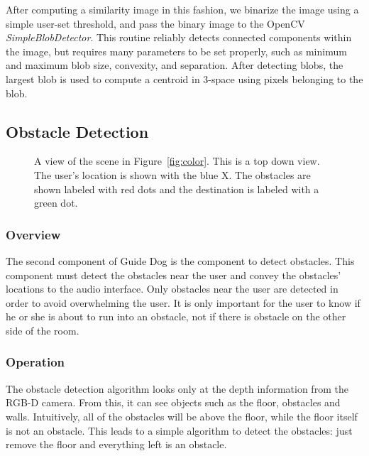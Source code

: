 After computing a similarity image in this fashion, we binarize the image
using a simple user-set threshold, and pass the binary image to the OpenCV~\cite{opencv-website}
\emph{SimpleBlobDetector}. This routine reliably detects connected components
within the image, but requires many parameters to be set properly, such as
minimum and maximum  blob size, convexity, and separation. After detecting blobs, the 
largest blob is used to compute a centroid in 3-space using pixels belonging 
to the blob.

\subsection{Obstacle Detection}
\label{sec:technical-obs}

\begin{figure}
\caption{A view of the scene in Figure~\ref{fig:color}. This is a top down view.
  The user's location is shown with the blue X. The obstacles are shown labeled
  with red dots and the destination is labeled with a green dot.}
\label{fig:obstacle}
\end{figure}

\subsubsection{Overview}
\label{sec:technical-obs-overview}

The second component of Guide Dog is the component to detect obstacles. This
component must detect the obstacles near the user and convey the obstacles'
locations to the audio interface. Only obstacles near the user are detected in
order to avoid overwhelming the user. It is only important for the user to
know if he or she is about to run into an obstacle, not if there is obstacle on the
other side of the room.

\subsubsection{Operation}
\label{sec:technical-obs-op}

The obstacle detection algorithm looks only at the depth information from the
RGB-D camera. From this, it can see objects such as the floor, obstacles and
walls. Intuitively, all of the obstacles will be above the floor, while the floor
itself is not an obstacle. This leads to a simple algorithm to detect the
obstacles: just remove the floor and everything left is an obstacle.

